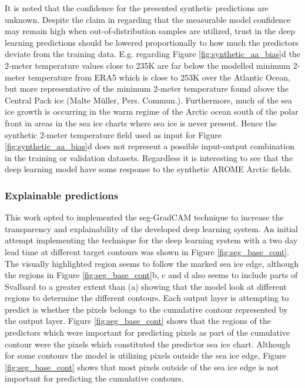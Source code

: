 \documentclass[../main/thesis]{subfiles}
\begin{document}
It is noted that the confidence for the presented synthetic predictions are unknown. Despite the claim in \citet{DeVries2018} regarding that the measurable model confidence may remain high when out-of-distribution samples are utilized, trust in the deep learning predictions should be lowered proportionally to how much the predictors deviate from the training data. E.g. regarding Figure \ref{fig:synthetic_aa_bias}d the 2-meter temperature values close to 235K are far below the modelled minimum 2-meter temperature from ERA5 which is close to 253K over the Atlantic Ocean, but more representative of the minimum 2-meter temperature found above the Central Pack ice (Malte Müller, Pers. Commun.). Furthermore, much of the sea ice growth is occurring in the warm regime of the Arctic ocean south of the polar front \citep{Johannessen1978} in areas in the sea ice charts where sea ice is never present. Hence the synthetic 2-meter temperature field used as input for Figure \ref{fig:synthetic_aa_bias}d does not represent a possible input-output combination in the training or validation datasets. Regardless it is interesting to see that the deep learning model have some response to the synthetic AROME Arctic fields.

\subsubsection{Explainable predictions}
\label{sec:discuss_seggradcam}
This work opted to implemented the seg-GradCAM technique \citep{Vinogradova2020} to increase the transparency and explainability of the developed deep learning system. An initial attempt implementing the technique for the deep learning system with a two day lead time at different target contours was shown in Figure \ref{fig:seg_base_cont}. The visually highlighted region seems to follow the marked sea ice edge, although the regions in Figure \ref{fig:seg_base_cont}b, c and d also seems to include parts of Svalbard to a greater extent than (a) showing that the model look at different regions to determine the different contours. Each output layer is attempting to predict is whether the pixels belongs to the cumulative contour represented by the output layer. Figure \ref{fig:seg_base_cont} shows that the regions of the predictors which were important for predicting pixels as part of the cumulative contour were the pixels which constituted the predictor sea ice chart. Although for some contours the model is utilizing pixels outside the sea ice edge, Figure \ref{fig:seg_base_cont} shows that most pixels outside of the sea ice edge is not important for predicting the cumulative contours.
\end{document}
